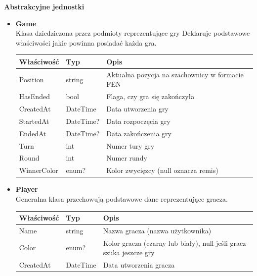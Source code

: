 \documentclass[12pt,a4paper]{article}
\begin{document}
\newpage

\textbf{Abstrakcyjne jednostki}\\

\begin{itemize}
    \item \textbf{Game}\\
    Klasa dziedziczona przez podmioty reprezentujące gry Deklaruje podstawowe właściwości jakie powinna posiadać każda gra.
    \renewcommand{\arraystretch}{1.5}
    \begin{longtable}{|m{4cm}|m{2cm}|m{8cm}|}
        \hline
        \rowcolor{lightgray}
        \textbf{Właściwość} & \textbf{Typ} & \textbf{Opis} \\ \hline
        \endhead
        \hline
        Position & string & Aktualna pozycja na szachownicy w formacie FEN \\ \hline
        HasEnded & bool & Flaga, czy gra się zakończyła \\ \hline
        CreatedAt & DateTime & Data utworzenia gry \\ \hline
        StartedAt & DateTime? & Data rozpoczęcia gry \\ \hline
        EndedAt & DateTime? & Data zakończenia gry \\ \hline
        Turn & int & Numer tury gry \\ \hline
        Round & int & Numer rundy \\ \hline
        WinnerColor & enum? & Kolor zwycięzcy (null oznacza remis) \\ \hline
    \end{longtable}

    \item \textbf{Player}\\
    Generalna klasa przechowują podstawowe dane reprezentujące gracza.
    \renewcommand{\arraystretch}{1.5}
    \begin{longtable}{|m{4cm}|m{2cm}|m{8cm}|}
        \hline
        \rowcolor{lightgray}
        \textbf{Właściwość} & \textbf{Typ} & \textbf{Opis} \\ \hline
        \endhead
        \hline
        Name & string & Nazwa gracza (nazwa użytkownika) \\ \hline
        Color & enum? & Kolor gracza (czarny lub biały), null jeśli gracz szuka jeszcze gry \\ \hline
        CreatedAt & DateTime & Data utworzenia gracza \\ \hline
    \end{longtable}


\end{itemize}
\end{document}
